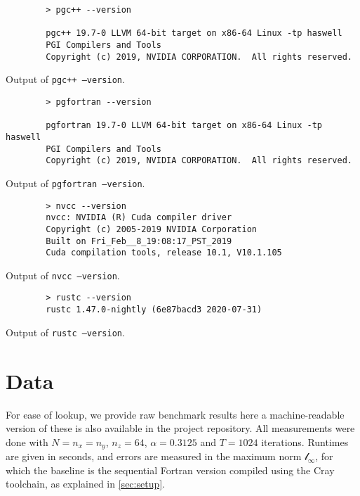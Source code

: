 \documentclass[british]{scrreprt}
\begin{document}
\begin{listing}
	\centering
	\begin{verbatim}
		> pgc++ --version

		pgc++ 19.7-0 LLVM 64-bit target on x86-64 Linux -tp haswell
		PGI Compilers and Tools
		Copyright (c) 2019, NVIDIA CORPORATION.  All rights reserved.
	\end{verbatim}
	\caption{Output of \texttt{pgc++ --version}.}
\end{listing}

\begin{listing}
	\centering
	\begin{verbatim}
		> pgfortran --version

		pgfortran 19.7-0 LLVM 64-bit target on x86-64 Linux -tp haswell
		PGI Compilers and Tools
		Copyright (c) 2019, NVIDIA CORPORATION.  All rights reserved.
	\end{verbatim}
	\caption{Output of \texttt{pgfortran --version}.}
\end{listing}

\begin{listing}
	\centering
	\begin{verbatim}
		> nvcc --version
		nvcc: NVIDIA (R) Cuda compiler driver
		Copyright (c) 2005-2019 NVIDIA Corporation
		Built on Fri_Feb__8_19:08:17_PST_2019
		Cuda compilation tools, release 10.1, V10.1.105
	\end{verbatim}
	\caption{Output of \texttt{nvcc --version}.}
\end{listing}

\begin{listing}
	\centering
	\begin{verbatim}
		> rustc --version
		rustc 1.47.0-nightly (6e87bacd3 2020-07-31)
	\end{verbatim}
	\caption{Output of \texttt{rustc --version}.}
\end{listing}

\chapter{Data}
\label{app:data}
For ease of lookup, we provide raw benchmark results here\textemdash{} a machine-readable version of these is also available in the project repository. All measurements were done with \( N = n_{x} = n_{y} \), \( n_{z} = 64 \), \( \alpha = 0.3125 \) and \( T = 1024 \) iterations. Runtimes are given in seconds, and errors are measured in the maximum norm $\mathcal{l}_{\infty}$, for which the baseline is the sequential Fortran version compiled using the Cray toolchain, as explained in \cref{sec:setup}.
\end{document}
